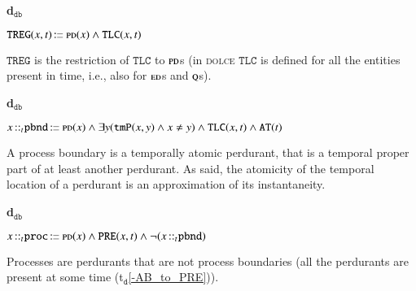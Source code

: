 \documentclass[ao]{iosart2x}
\newcommand{\dolceAxLabel}{\textrm{a$_\texttt{d}$}}
\newcommand{\dolceThrLabel}{\textrm{t$_\texttt{d}$}}
\newcommand{\dbDefLabel}{\textrm{d$_\texttt{db}$}}
\newcounter{cntdbdf}
\newcommand{\dbdf}[1]{\refstepcounter{cntdbdf}\begin{small}{\bf \dbDefLabel\thecntdbdf\label{#1}}\end{small}}
\newcommand{\refdolceax}[1]{({\dolceAxLabel}\ref{#1})}
\newcommand{\refdolceth}[1]{({\dolceThrLabel}\ref{#1})}
\newcommand{\pr}[1]{\mathtt{#1}}
\newcommand{\cn}[1]{\mathtt{#1}}
\newcommand\textequal{%
 \rule[.08ex]{5pt}{0.35pt}\llap{\rule[.78ex]{5pt}{0.35pt}}}
\newcommand{\sdef}{{\hspace{1.5pt}:\hspace{-2.5pt}\textequal\hspace{3pt}}}
\newcommand{\dolce}{{\textsc{dolce}}}
\newcommand {\ABdcat} {\textsc{ab}}
\newcommand {\EDdcat} {\textsc{ed}}
\newcommand {\PDdcat} {\textsc{pd}}
\newcommand {\Qdcat} {\textsc{q}}
\newcommand {\PPd} {\ensuremath{\pr{PP}}}
\newcommand {\ATd} {\ensuremath{\pr{AT}}}
\newcommand {\PREd} {\ensuremath{\pr{PRE}}}
\newcommand {\TLCd} {\ensuremath{\pr{TLC}}}
\newcommand{\procbcat}{\cn{proc}}
\newcommand{\pbndbcat}{\cn{pbnd}}
\newcommand{\bfotpart}{\pr{tmP}}
\newcommand{\bfotppart}{\pr{tmPP}}
\newcommand{\bfoexist}{\pr{EX}}
\newcommand{\bfoiof}[1]{{\,::_{#1\:\!}}}
\newcommand{\bfotregof}{\pr{TREG}}
\begin{document}
\item[\dbdf{d2b_tregof}] $\bfotregof(x,t) \sdef \PDdcat(x) \land \TLCd(x,t)$

\vspace{1pt}
$\bfotregof$ is the restriction of $\TLCd$ to $\PDdcat$s (in {\dolce} $\TLCd$ is defined for all the entities present in time, i.e., also for $\EDdcat$s and $\Qdcat$s).  

%
 
\item[\dbdf{d2b_pbnd}] $x \bfoiof{t} \pbndbcat \sdef \PDdcat(x) \land \exists y(\bfotpart(x,y) \land x \neq y) \land \TLCd(x,t) \land \ATd(t)$

\vspace{1pt}
A process boundary is a temporally atomic perdurant, that is a temporal proper part of at least another perdurant. As said, the atomicity of the temporal location of a perdurant is an approximation of its instantaneity. 

%
%
%

\item[\dbdf{d2b_proc}] $x \bfoiof{t} \procbcat \sdef \PDdcat(x) \land \PREd(x,t) \land \neg(x \bfoiof{t} \pbndbcat)$

\vspace{1pt}
Processes are perdurants that are not process boundaries (all the perdurants are present at some time \refdolceth{-AB_to_PRE}).

%
\end{document}
